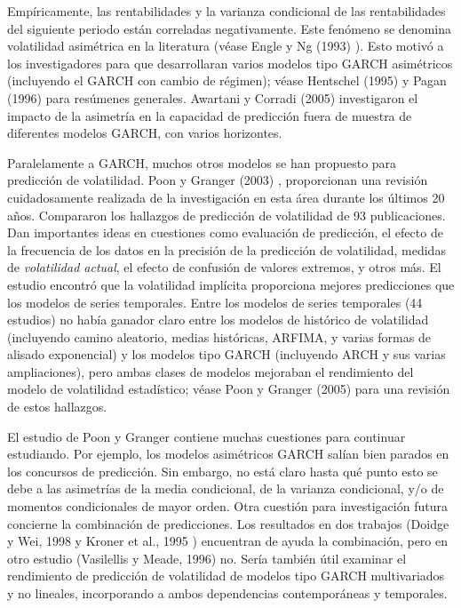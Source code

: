 \documentclass{llncs}
\begin{document}
Empíricamente, las rentabilidades y la varianza condicional de las rentabilidades del siguiente periodo están correladas negativamente. Este fenómeno se denomina volatilidad asimétrica en la literatura (véase Engle y Ng (1993) \cite{Engle19931749}). Esto motivó a los investigadores para que desarrollaran varios modelos tipo GARCH asimétricos (incluyendo el GARCH con cambio de régimen); véase Hentschel (1995) \cite{Hentschel199571} y Pagan (1996) \cite{Pagan199615} para resúmenes generales. Awartani y Corradi (2005) investigaron el impacto de la asimetría en la capacidad de predicción fuera de muestra de diferentes modelos GARCH, con varios horizontes.

Paralelamente a GARCH, muchos otros modelos se han propuesto para predicción de volatilidad. Poon y Granger (2003) \cite{Poon2003478}, proporcionan una revisión cuidadosamente realizada de la investigación en esta área durante los últimos 20 años. Compararon los hallazgos de predicción de volatilidad de 93 publicaciones. Dan importantes ideas en cuestiones como evaluación de predicción, el efecto de la frecuencia de los datos en la precisión de la predicción de volatilidad, medidas de \emph{volatilidad actual}, el efecto de confusión de valores extremos, y otros más. El estudio encontró que la volatilidad implícita proporciona mejores predicciones que los modelos de series temporales. Entre los modelos de series temporales (44 estudios) no había ganador claro entre los modelos de histórico de volatilidad (incluyendo camino aleatorio, medias históricas, ARFIMA, y varias formas de alisado exponencial) y los modelos tipo GARCH (incluyendo ARCH y sus varias ampliaciones), pero ambas clases de modelos mejoraban el rendimiento del modelo de volatilidad estadístico; véase Poon y Granger (2005) para una revisión de estos hallazgos.

El estudio de Poon y Granger contiene muchas cuestiones para continuar estudiando. Por ejemplo, los modelos asimétricos GARCH salían bien parados en los concursos de predicción. Sin embargo, no está claro hasta qué punto esto se debe a las asimetrías de la media condicional, de la varianza condicional, y/o de momentos condicionales de  mayor orden. Otra cuestión para investigación futura concierne la combinación de predicciones. Los resultados en dos trabajos (Doidge y Wei, 1998 \cite{Doidge199828} y Kroner et al., 1995 \cite{Kroner199577}) encuentran de ayuda la combinación, pero en otro estudio (Vasilellis y Meade, 1996) \cite{Vasilellis1996125} no. Sería también útil examinar el rendimiento de predicción de volatilidad de modelos tipo GARCH multivariados y no lineales, incorporando a ambos dependencias contemporáneas y temporales.
\end{document}
